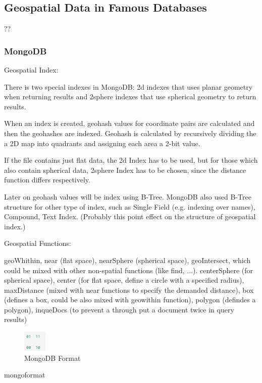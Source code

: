 \documentclass[a4paper,12pt]{article}
\begin{document}
\subsection{Geospatial Data in Famous Databases} ??
\label{s.dbs}
\subsubsection{MongoDB}
\cite{mongogeneral2010}
\cite{mongoinaction2011}

Geospatial Index:

There is two special indexes in MongoDB: 2d indexes that uses planar geometry when returning results and 2sphere indexes that use spherical geometry to return results.

When an index is created, geohash values for coordinate pairs are calculated and then the geohashes are indexed.
Geohash is calculated by recursively dividing the a 2D map into quadrants and assigning each area a 2-bit value.


If the file contains just flat data, the 2d Index has to be used, but for those which also contain spherical data, 2sphere Index has to be chosen, since the distance function differs respectively.

Later on geohash values will be index using B-Tree. 
MongoDB also used B-Tree structure for other type of index, such as Single Field (e.g. indexing over names), Compound, Text Index. (Probably this point effect on the structure of geospatial index.)

Geospatial Functions:

geoWhithin, near (flat space), nearSphere (spherical space), geoIntersect, which could be mixed with other non-spatial functions (like find, ...). 
centerSphere (for spherical space), center (for flat space, define a circle with a specified radius), maxDistance (mixed with near functions to specify the demanded distance), box (defines a box, could be also mixed with geowithin function), polygon (defindes a polygon), inqueDocs (to prevent a through put a document twice in query results)

\begin{figure}
\centering
\includegraphics[width=0.1\textwidth]{mongoformat}
\caption{MongoDB Format}
\label{fig}
\end{figure}

mongoformat
\end{document}
